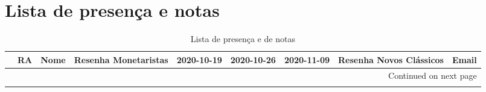 \documentclass[11pt]{article}
\begin{document}
\section{Lista de presença e notas}
\label{sec:orgfa9f8f5}
\begin{center}\begin{landscape}
\small
\setlength\LTleft{0pt}
\setlength\LTright{0pt}
\begin{longtable}{lllrrrrrl}
\caption{Lista de presença e de notas}\label{lista}\\
\toprule
{} &      RA &                                  Nome &  Resenha Monetaristas &  2020-10-19 &  2020-10-26 &  2020-11-09 &  Resenha Novos Clássicos &               Email \\
\midrule
\endhead
\midrule
\multicolumn{9}{r}{{Continued on next page}} \\
\midrule
\endfoot


\end{longtable}
\end{landscape}
\end{center}
\end{document}
